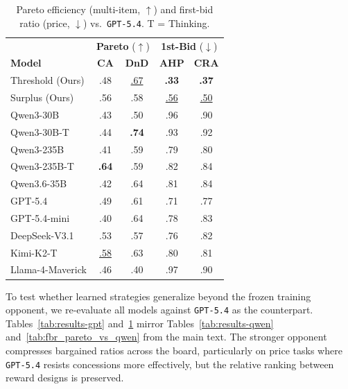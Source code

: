 \documentclass[11pt]{article}
\newcommand{\model}[1]{\texttt{#1}}
\newcommand{\lightrule}{\arrayrulecolor{black!20}\midrule\arrayrulecolor{black}}
\begin{document}
\begin{table}[ht]
\centering
\scriptsize
\setlength{\tabcolsep}{3pt}
\renewcommand{\arraystretch}{1.15}
\begin{tabular}{l cc cc}
\toprule
\rowcolor{tableheader}
& \multicolumn{2}{c}{\textbf{Pareto} ($\uparrow$)} & \multicolumn{2}{c}{\textbf{1st-Bid} ($\downarrow$)} \\
\rowcolor{tableheader}
\textbf{Model} & \textbf{CA} & \textbf{DnD} & \textbf{AHP} & \textbf{CRA} \\
\midrule
\rowcolor{tablerow}
Threshold (Ours) & .48              & \underline{.67}  & \textbf{.33} & \textbf{.37} \\
Surplus (Ours)   & .56              & .58              & \underline{.56} & \underline{.50} \\
\lightrule
\rowcolor{tablerow}
Qwen3-30B        & .43              & .50              & .96          & .90 \\
Qwen3-30B-T      & .44              & \textbf{.74}     & .93          & .92 \\
\rowcolor{tablerow}
Qwen3-235B       & .41              & .59              & .79          & .80 \\
Qwen3-235B-T     & \textbf{.64}     & .59              & .82          & .84 \\
\rowcolor{tablerow}
Qwen3.6-35B      & .42              & .64              & .81          & .84 \\
GPT-5.4          & .49              & .61              & .71          & .77 \\
GPT-5.4-mini     & .40              & .64              & .78          & .83 \\
\rowcolor{tablerow}
DeepSeek-V3.1    & .53              & .57              & .76          & .82 \\
Kimi-K2-T        & \underline{.58}  & .63              & .80          & .81 \\
\rowcolor{tablerow}
Llama-4-Maverick & .46              & .40              & .97          & .90 \\
\bottomrule
\end{tabular}
\caption{Pareto efficiency (multi-item, $\uparrow$) and first-bid ratio (price, $\downarrow$) vs.\ \model{GPT-5.4}. T = Thinking.}
\label{tab:fbr_pareto_vs_gpt}
\end{table}



To test whether learned strategies generalize beyond the frozen training opponent, we re-evaluate all models against \model{GPT-5.4} as the counterpart. Tables~\ref{tab:results-gpt} and~\ref{tab:fbr_pareto_vs_gpt} mirror Tables~\ref{tab:results-qwen} and~\ref{tab:fbr_pareto_vs_qwen} from the main text. The stronger opponent compresses bargained ratios across the board, particularly on price tasks where \model{GPT-5.4} resists concessions more effectively, but the relative ranking between reward designs is preserved.
\end{document}
